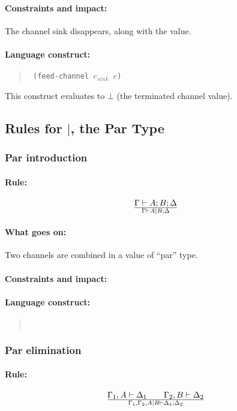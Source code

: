\documentclass[a4paper]{article}
\begin{document}
\paragraph{Constraints and impact:} The channel sink disappears, along
with the value.

\paragraph{Language construct:}
\begin{quote}\tt
  (feed-channel $e_{sink}$ $e$)
\end{quote}
This construct evaluates to $\bot$ (the terminated channel value).


\subsection{Rules for $|$, the Par Type}


\subsubsection{Par introduction}

\paragraph{Rule:}
$$
{
  \Gamma \vdash A; B; \Delta
}\over{
  \Gamma \vdash A|B; \Delta
}
$$
\paragraph{What goes on:} Two channels are combined in a value of ``par'' type.
\paragraph{Constraints and impact:}
\paragraph{Language construct:}
\begin{quote}\tt
\end{quote}

\subsubsection{Par elimination}

\paragraph{Rule:}
$$
{
  \Gamma_1, A \vdash \Delta_1
  \qquad
  \Gamma_2, B \vdash \Delta_2
}\over{
  \Gamma_1, \Gamma_2, A|B \vdash \Delta_1; \Delta_2
}
$$
\end{document}
